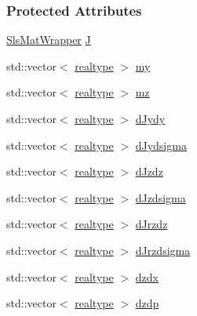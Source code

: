 \subsubsection*{Protected Attributes}
\begin{DoxyCompactItemize}
\item 
\mbox{\hyperlink{classamici_1_1_sls_mat_wrapper}{Sls\+Mat\+Wrapper}} \mbox{\hyperlink{classamici_1_1_model_a23d87dde1f3cedfdd1a5b1e703e381ad}{J}}
\item 
std\+::vector$<$ \mbox{\hyperlink{namespaceamici_a1bdce28051d6a53868f7ccbf5f2c14a3}{realtype}} $>$ \mbox{\hyperlink{classamici_1_1_model_ab9db87a0acf848c904c792edab3b5828}{my}}
\item 
std\+::vector$<$ \mbox{\hyperlink{namespaceamici_a1bdce28051d6a53868f7ccbf5f2c14a3}{realtype}} $>$ \mbox{\hyperlink{classamici_1_1_model_afff14791b6839ad61750cc360e44e890}{mz}}
\item 
std\+::vector$<$ \mbox{\hyperlink{namespaceamici_a1bdce28051d6a53868f7ccbf5f2c14a3}{realtype}} $>$ \mbox{\hyperlink{classamici_1_1_model_a3ac4a9286766476c57fba8edbb2da345}{d\+Jydy}}
\item 
std\+::vector$<$ \mbox{\hyperlink{namespaceamici_a1bdce28051d6a53868f7ccbf5f2c14a3}{realtype}} $>$ \mbox{\hyperlink{classamici_1_1_model_a32c9ff2e3e5e1fa69bd54ca0ceb41876}{d\+Jydsigma}}
\item 
std\+::vector$<$ \mbox{\hyperlink{namespaceamici_a1bdce28051d6a53868f7ccbf5f2c14a3}{realtype}} $>$ \mbox{\hyperlink{classamici_1_1_model_a6f9b92825da48e6a4b879a31670626f9}{d\+Jzdz}}
\item 
std\+::vector$<$ \mbox{\hyperlink{namespaceamici_a1bdce28051d6a53868f7ccbf5f2c14a3}{realtype}} $>$ \mbox{\hyperlink{classamici_1_1_model_adb1036c3ad16c2b4c48b71452eab63c7}{d\+Jzdsigma}}
\item 
std\+::vector$<$ \mbox{\hyperlink{namespaceamici_a1bdce28051d6a53868f7ccbf5f2c14a3}{realtype}} $>$ \mbox{\hyperlink{classamici_1_1_model_a80eade42075bbd373d5531c6fd7cd877}{d\+Jrzdz}}
\item 
std\+::vector$<$ \mbox{\hyperlink{namespaceamici_a1bdce28051d6a53868f7ccbf5f2c14a3}{realtype}} $>$ \mbox{\hyperlink{classamici_1_1_model_ad38f72dc10596ffb60d0472dc4b7eade}{d\+Jrzdsigma}}
\item 
std\+::vector$<$ \mbox{\hyperlink{namespaceamici_a1bdce28051d6a53868f7ccbf5f2c14a3}{realtype}} $>$ \mbox{\hyperlink{classamici_1_1_model_a2f5f73b0bb67ee69c461c01e2dadaecc}{dzdx}}
\item 
std\+::vector$<$ \mbox{\hyperlink{namespaceamici_a1bdce28051d6a53868f7ccbf5f2c14a3}{realtype}} $>$ \mbox{\hyperlink{classamici_1_1_model_a5d743131ef6be8aa56865fd100acd137}{dzdp}}

\end{DoxyCompactItemize}
